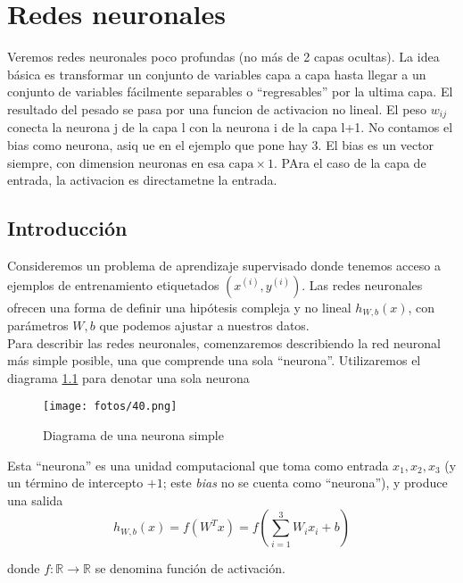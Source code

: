 \chapter{Redes neuronales}\label{Chapter7} 

Veremos redes neuronales poco profundas (no más de 2 capas ocultas). La idea básica es transformar un conjunto de variables capa a capa hasta llegar a un conjunto de variables fácilmente separables o ``regresables'' por la ultima capa. El resultado del pesado se pasa por una funcion de activacion no lineal. El peso $w_{ij}$ conecta la neurona j de la capa l con la neurona i de la capa l+1. No contamos el bias como neurona, asiq ue en el ejemplo que pone hay 3. El bias es un vector siempre, con dimension $\text{neuronas en esa capa} \times 1$. PAra el caso de la capa de entrada, la activacion es directametne la entrada. 

\section{Introducción}

Consideremos un problema de aprendizaje supervisado donde tenemos acceso a ejemplos de entrenamiento etiquetados $(x^{(i)}, y^{(i)})$. Las redes neuronales ofrecen una forma de definir una hipótesis compleja y no lineal $h_{W,b}(x)$, con parámetros $W, b$ que podemos ajustar a nuestros datos. \\

Para describir las redes neuronales, comenzaremos describiendo la red neuronal más simple posible, una que comprende una sola ``neurona''. Utilizaremos el diagrama \ref{fig:7.1} para denotar una sola neurona

\begin{figure}[H]
\centering
\texttt{[image: fotos/40.png]}
\caption{Diagrama de una neurona simple}
\label{fig:7.1}
\end{figure}

Esta ``neurona'' es una unidad computacional que toma como entrada $x_1, x_2, x_3$ (y un término de intercepto $+1$; este \textit{bias} no se cuenta como ``neurona''), y produce una salida 
\begin{equation}
h_{W,b}(x) = f(W^T x) = f\left(\sum_{i=1}^{3} W_i x_i + b\right)
\end{equation}

\noindent donde $f: \mathbb{R} \rightarrow \mathbb{R}$ se denomina función de activación. 

